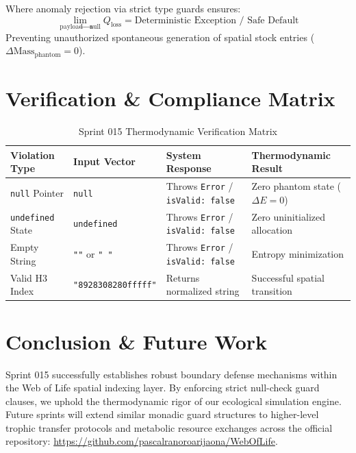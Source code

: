 \documentclass[11pt, a4paper]{article}
\begin{document}
Where anomaly rejection via strict type guards ensures:
\begin{equation}
\lim_{\text{payload} \to \text{null}} Q_{\text{loss}} = \text{Deterministic Exception / Safe Default}
\end{equation}
Preventing unauthorized spontaneous generation of spatial stock entries ($\Delta \text{Mass}_{\text{phantom}} = 0$).

\section{Verification \& Compliance Matrix}

\begin{table}[htbp]
\centering
\begin{tabular}{|l|l|l|l|}
\hline
\textbf{Violation Type} & \textbf{Input Vector} & \textbf{System Response} & \textbf{Thermodynamic Result} \\ \hline
\texttt{null} Pointer & \texttt{null} & Throws \texttt{Error} / \texttt{isValid: false} & Zero phantom state ($\Delta E = 0$) \\ \hline
\texttt{undefined} State & \texttt{undefined} & Throws \texttt{Error} / \texttt{isValid: false} & Zero uninitialized allocation \\ \hline
Empty String & \texttt{""} or \texttt{"   "} & Throws \texttt{Error} / \texttt{isValid: false} & Entropy minimization \\ \hline
Valid H3 Index & \texttt{"8928308280fffff"} & Returns normalized string & Successful spatial transition \\ \hline
\end{tabular}
\caption{Sprint 015 Thermodynamic Verification Matrix}
\end{table}

\section{Conclusion \& Future Work}
Sprint 015 successfully establishes robust boundary defense mechanisms within the Web of Life spatial indexing layer. By enforcing strict null-check guard clauses, we uphold the thermodynamic rigor of our ecological simulation engine. Future sprints will extend similar monadic guard structures to higher-level trophic transfer protocols and metabolic resource exchanges across the official repository: \url{https://github.com/pascalranoroarijaona/WebOfLife}.
\end{document}
